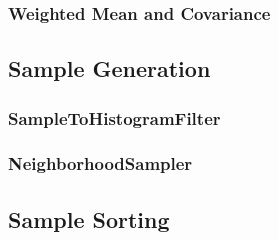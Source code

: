 \ifitkFullVersion

\fi

\subsubsection{Weighted Mean and Covariance}
\label{sec:WeightedMeanCovariance}

\ifitkFullVersion

\fi

\subsection{Sample Generation}
\label{sec:SampleGeneration}

\subsubsection{SampleToHistogramFilter}
\label{sec:SampleToHistogramFilter}

\ifitkFullVersion

\fi


\subsubsection{NeighborhoodSampler}
\label{sec:NeighborhoodSampler}

\ifitkFullVersion

\fi


\subsection{Sample Sorting}
\label{sec:SampleSorting}

